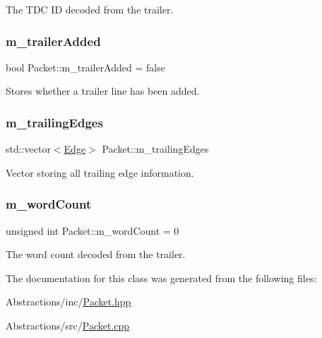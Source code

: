 The T\+DC ID decoded from the trailer. 

\mbox{\label{class_packet_a046581698cdcca7297109ceaeed7e014}} 
\subsubsection{\texorpdfstring{m\+\_\+trailer\+Added}{m\_trailerAdded}}
{\footnotesize\ttfamily bool Packet\+::m\+\_\+trailer\+Added = false\hspace{0.3cm}{\ttfamily [private]}}



Stores whether a trailer line has been added. 

\mbox{\label{class_packet_a0a91b78992e75fd203a187dcb34a81c1}} 
\subsubsection{\texorpdfstring{m\+\_\+trailing\+Edges}{m\_trailingEdges}}
{\footnotesize\ttfamily std\+::vector$<$\hyperlink{class_edge}{Edge}$>$ Packet\+::m\+\_\+trailing\+Edges\hspace{0.3cm}{\ttfamily [private]}}



Vector storing all trailing edge information. 

\mbox{\label{class_packet_a6c3f1d98101c049bc032aca63d244b89}} 
\subsubsection{\texorpdfstring{m\+\_\+word\+Count}{m\_wordCount}}
{\footnotesize\ttfamily unsigned int Packet\+::m\+\_\+word\+Count = 0\hspace{0.3cm}{\ttfamily [private]}}



The word count decoded from the trailer. 



The documentation for this class was generated from the following files\+:\begin{DoxyCompactItemize}
\item 
Abstractions/inc/\hyperlink{_packet_8hpp}{Packet.\+hpp}\item 
Abstractions/src/\hyperlink{_packet_8cpp}{Packet.\+cpp}\end{DoxyCompactItemize}
